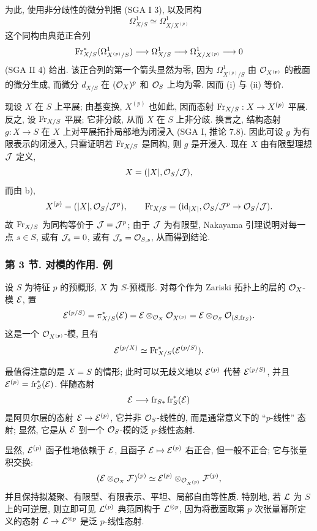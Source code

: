 为此, 使用非分歧性的微分判据 (SGA I 3), 以及同构
\[
\Omega^1_{X/S}\simeq \Omega^1_{X/X^{(p)}}
\]
这个同构由典范正合列
\[
\operatorname{Fr}_{X/S}^*(\Omega^1_{X^{(p)}/S})\longrightarrow \Omega^1_{X/S}
\longrightarrow \Omega^1_{X/X^{(p)}}\longrightarrow 0
\]
(SGA II 4) 给出. 该正合列的第一个箭头显然为零, 因为 $\Omega^1_{X^{(p)}/S}$ 由 $\mathcal{O}_{X^{(p)}}$ 的截面的微分生成, 而微分 $d_{X/S}$ 在 $(\mathcal{O}_X)^p$ 和 $\mathcal{O}_S$ 上均为零. 因而 (i) 与 (ii) 等价.

现设 $X$ 在 $S$ 上平展; 由基变换, $X^{(p)}$ 也如此, 因而态射 $\operatorname{Fr}_{X/S}:X\to X^{(p)}$ 平展. 反之, 设 $\operatorname{Fr}_{X/S}$ 平展; 它非分歧, 从而 $X$ 在 $S$ 上非分歧. 换言之, 结构态射 $g:X\to S$ 在 $X$ 上对平展拓扑局部地为闭浸入 (SGA I, 推论 7.8). 因此可设 $g$ 为有限表示的闭浸入, 只需证明若 $\operatorname{Fr}_{X/S}$ 是同构, 则 $g$ 是开浸入. 现在 $X$ 由有限型理想 $\mathcal J$ 定义,
\[
X=(|X|,\mathcal{O}_S/\mathcal J),
\]
而由 b),
\[
X^{(p)}=(|X|,\mathcal{O}_S/\mathcal J^p),
\qquad
\operatorname{Fr}_{X/S}=(\operatorname{id}_{|X|},\mathcal{O}_S/\mathcal J^p\to\mathcal{O}_S/\mathcal J).
\]
故 $\operatorname{Fr}_{X/S}$ 为同构等价于 $\mathcal J=\mathcal J^p$; 由于 $\mathcal J$ 为有限型, Nakayama 引理说明对每一点 $s\in S$, 或有 $\mathcal J_s=0$, 或有 $\mathcal J_s=\mathcal{O}_{S,s}$, 从而得到结论.

\subsubsection*{第 3 节. 对模的作用. 例}

设 $S$ 为特征 $p$ 的预概形, $X$ 为 $S$-预概形. 对每个作为 Zariski 拓扑上的层的 $\mathcal{O}_X$-模 $\mathcal E$, 置
\[
\mathcal E^{(p/S)}=\pi_{X/S}^*(\mathcal E)=\mathcal E\otimes_{\mathcal{O}_X}\mathcal{O}_{X^{(p)}}
 =\mathcal E\otimes_{\mathcal{O}_S}\mathcal{O}_{(S,\operatorname{fr}_S)}.
\]
这是一个 $\mathcal{O}_{X^{(p)}}$-模, 且有
\[
\mathcal E^{(p/X)}\simeq \operatorname{Fr}_{X/S}^*(\mathcal E^{(p/S)}).
\]

最值得注意的是 $X=S$ 的情形; 此时可以无歧义地以 $\mathcal E^{(p)}$ 代替 $\mathcal E^{(p/S)}$, 并且 $\mathcal E^{(p)}=\operatorname{fr}_S^*(\mathcal E)$. 伴随态射
\[
\mathcal E\longrightarrow \operatorname{fr}_{S*}\operatorname{fr}_S^*(\mathcal E)
\]
是阿贝尔层的态射 $\mathcal E\to\mathcal E^{(p)}$, 它并非 $\mathcal{O}_S$-线性的, 而是通常意义下的 ``$p$-线性'' 态射; 显然, 它是从 $\mathcal E$ 到一个 $\mathcal{O}_S$-模的泛 $p$-线性态射.

显然, $\mathcal E^{(p)}$ 函子性地依赖于 $\mathcal E$, 且函子 $\mathcal E\mapsto\mathcal E^{(p)}$ 右正合, 但一般不正合; 它与张量积交换:
\[
(\mathcal E\otimes_{\mathcal{O}_X}\mathcal F)^{(p)}\simeq
\mathcal E^{(p)}\otimes_{\mathcal{O}_{X^{(p)}}}\mathcal F^{(p)},
\]
并且保持拟凝聚、有限型、有限表示、平坦、局部自由等性质. 特别地, 若 $\mathcal L$ 为 $S$ 上的可逆层, 则立即可见 $\mathcal L^{(p)}$ 典范同构于 $\mathcal L^{\otimes p}$, 因为将截面取第 $p$ 次张量幂所定义的态射 $\mathcal L\to\mathcal L^{\otimes p}$ 是泛 $p$-线性态射.

